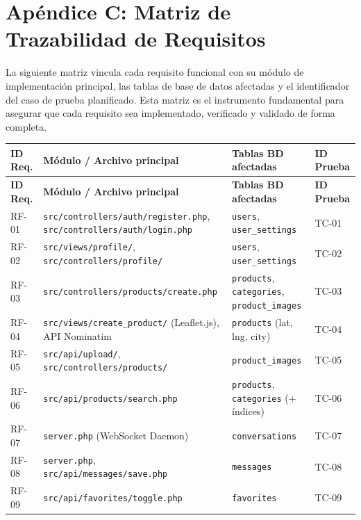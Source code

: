 \documentclass[11pt,a4paper]{report}
\begin{document}
\newpage
\section{Apéndice C: Matriz de Trazabilidad de Requisitos}

La siguiente matriz vincula cada requisito funcional con su módulo de implementación principal, las tablas de base de datos afectadas y el identificador del caso de prueba planificado. Esta matriz es el instrumento fundamental para asegurar que cada requisito sea implementado, verificado y validado de forma completa.

\begin{longtable}{|l|p{5.5cm}|p{5cm}|l|}
\hline
\rowcolor{NavyBlue}\color{white}\textbf{ID Req.} & \color{white}\textbf{Módulo / Archivo principal} & \color{white}\textbf{Tablas BD afectadas} & \color{white}\textbf{ID Prueba} \\ \hline
\endfirsthead
\hline
\rowcolor{NavyBlue}\color{white}\textbf{ID Req.} & \color{white}\textbf{Módulo / Archivo principal} & \color{white}\textbf{Tablas BD afectadas} & \color{white}\textbf{ID Prueba} \\ \hline
\endhead
RF-01 & \texttt{src/controllers/auth/register.php}, \texttt{src/controllers/auth/login.php} & \texttt{users}, \texttt{user\_settings} & TC-01 \\ \hline
RF-02 & \texttt{src/views/profile/}, \texttt{src/controllers/profile/} & \texttt{users}, \texttt{user\_settings} & TC-02 \\ \hline
RF-03 & \texttt{src/controllers/products/create.php} & \texttt{products}, \texttt{categories}, \texttt{product\_images} & TC-03 \\ \hline
RF-04 & \texttt{src/views/create\_product/} (Leaflet.js), API Nominatim & \texttt{products} (lat, lng, city) & TC-04 \\ \hline
RF-05 & \texttt{src/api/upload/}, \texttt{src/controllers/products/} & \texttt{product\_images} & TC-05 \\ \hline
RF-06 & \texttt{src/api/products/search.php} & \texttt{products}, \texttt{categories} (+ índices) & TC-06 \\ \hline
RF-07 & \texttt{server.php} (WebSocket Daemon) & \texttt{conversations} & TC-07 \\ \hline
RF-08 & \texttt{server.php}, \texttt{src/api/messages/save.php} & \texttt{messages} & TC-08 \\ \hline
RF-09 & \texttt{src/api/favorites/toggle.php} & \texttt{favorites} & TC-09 \\ \hline

\end{longtable}
\end{document}
